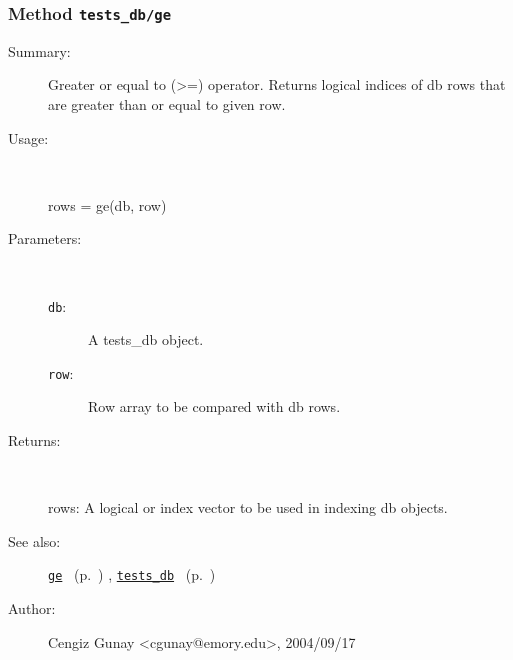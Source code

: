 \subsubsection[Method \texttt{ge}]{Method \texttt{tests\_db/ge}}%
%
\label{ref_tests_db__ge}%
\hypertarget{ref_tests_db__ge}{}%
\begin{description}
\item[Summary:]Greater or equal to (>=) operator. Returns logical indices of db rows 
	that are greater than or equal to given row.
%
\item[Usage:]~%
\begin{lyxcode}%
rows = ge(db, row)
%
\end{lyxcode}%
%
%
\item[Parameters:]~
\begin{description}%
\item[\texttt{db}:]
 A tests\_db object.
\item[\texttt{row}:]
 Row array to be compared with db rows.
\end{description}%
%
\item[Returns:]~

	rows: A logical or index vector to be used in indexing db objects. 
%
%
\item[See also:]%
\hyperlink{ref_ge}{\texttt{ge}}%
\ (p.~\pageref{ref_ge})%
%
, \hyperlink{ref_tests_db}{\texttt{tests\_db}}%
\ (p.~\pageref{ref_tests_db})%
%
%
\item[Author:]%
Cengiz Gunay <cgunay@emory.edu>, 2004/09/17%
\end{description}
\methodline%
